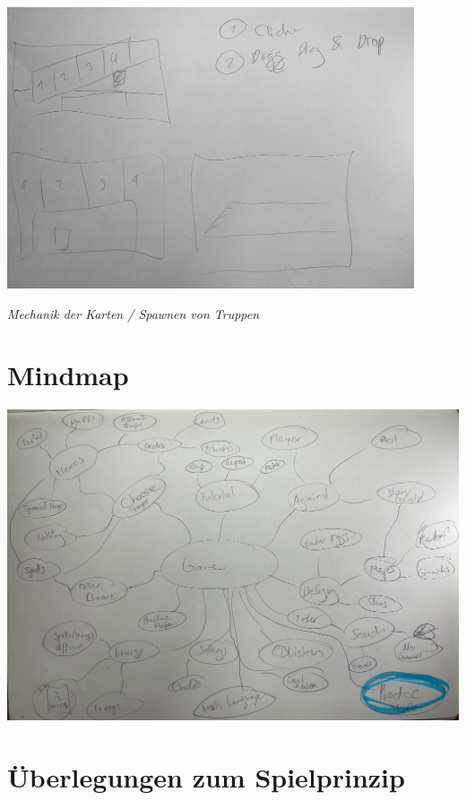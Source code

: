 \begin{center}
    \includegraphics*[width=12cm]{resources/Sk_dragndrop.jpeg}
\end{center}
\qquad \quad \enspace \textit{Mechanik der Karten / Spawnen von Truppen}

\section{Mindmap}
\begin{center}
    \includegraphics*[width=14.5cm]{resources/Sk_mindmap1.jpeg}
\end{center}


\section{Überlegungen zum Spielprinzip}

